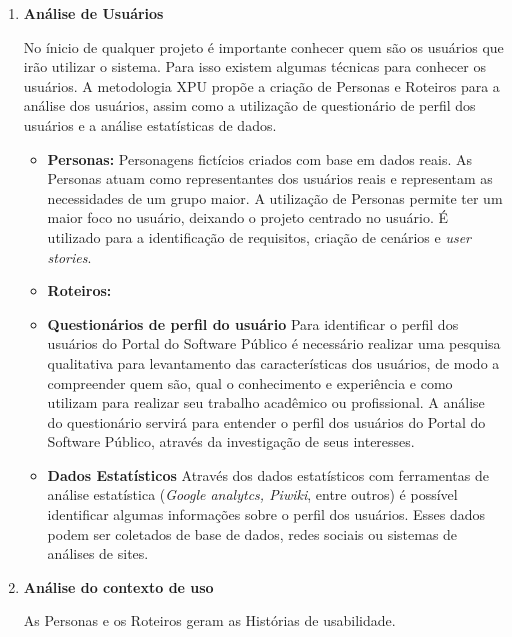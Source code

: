 \begin{enumerate}


	\item \textbf{Análise de Usuários}
	
	No ínicio de qualquer projeto é importante conhecer quem são os usuários que irão utilizar o sistema. Para isso existem algumas técnicas para conhecer os usuários.
	A metodologia XPU propõe a criação de Personas e Roteiros para a análise dos usuários, assim como a utilização de questionário de perfil dos usuários e a análise estatísticas de dados.
	
	\begin{itemize}
		\item \textbf{Personas:} Personagens fictícios criados com base em dados reais. As Personas atuam como representantes dos usuários reais e representam as necessidades de um grupo maior. 
		A utilização de Personas permite ter um maior foco no usuário, deixando o projeto centrado no usuário. É utilizado para a identificação de requisitos, criação de cenários e \textit{user stories}. 
		\item \textbf{Roteiros:}		
		
		\item \textbf{Questionários de perfil do usuário} Para identificar o perfil dos usuários do Portal do Software Público é necessário realizar uma pesquisa qualitativa para levantamento das características  dos usuários, de modo a compreender quem são, qual o conhecimento e experiência e como utilizam para realizar seu trabalho acadêmico ou profissional. 
		A análise do questionário servirá para entender o perfil dos usuários do Portal do Software Público, através da investigação de seus interesses. 

		\item \textbf{Dados Estatísticos} Através dos dados estatísticos com ferramentas de análise estatística (\textit{Google analytcs, Piwiki}, entre outros) é possível identificar algumas informações sobre o perfil dos usuários. Esses dados podem ser coletados de base de dados, redes sociais ou sistemas de análises de sites. 

	\end{itemize}
			
		
	\item \textbf{Análise do contexto de uso}

	As Personas e os Roteiros geram as Histórias de usabilidade.



\end{enumerate}
